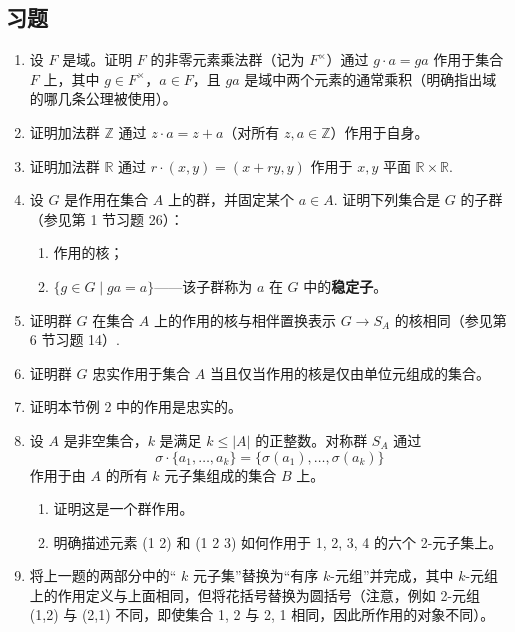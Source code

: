 \subsection*{习题}
\begin{enumerate}
\item 设 \( F \) 是域。证明 \( F \) 的非零元素乘法群（记为 \( F^\times \)）通过 \( g \cdot a = ga \) 作用于集合 \( F \) 上，其中 \( g \in F^\times \)，\( a \in F \)，且 \( ga \) 是域中两个元素的通常乘积（明确指出域的哪几条公理被使用）。

\item 证明加法群 \( \mathbb{Z} \) 通过 \( z \cdot a = z + a \)（对所有 \( z, a \in \mathbb{Z} \)）作用于自身。

\item 证明加法群 \( \mathbb{R} \) 通过 \( r \cdot (x, y) = (x + ry, y) \) 作用于 \( x, y \) 平面 \( \mathbb{R} \times \mathbb{R} \).

\item 设 \( G \) 是作用在集合 \( A \) 上的群，并固定某个 \( a \in A \). 证明下列集合是 \( G \) 的子群（参见第 1 节习题 26）：
\begin{enumerate}[label=(\alph*)]
\item 作用的核；
\item \( \{ g \in G \mid ga = a \} \)——该子群称为 \( a \) 在 \( G \) 中的\textbf{稳定子}。
\end{enumerate}

\item 证明群 \( G \) 在集合 \( A \) 上的作用的核与相伴置换表示 \( G \to S_A \) 的核相同（参见第 6 节习题 14）.

\item 证明群 \( G \) 忠实作用于集合 \( A \) 当且仅当作用的核是仅由单位元组成的集合。

\item 证明本节例 2 中的作用是忠实的。

\item 设 \( A \) 是非空集合，\( k \) 是满足 \( k \leq |A| \) 的正整数。对称群 \( S_A \) 通过
\[
\sigma \cdot \{a_1, \ldots, a_k\} = \{\sigma(a_1), \ldots, \sigma(a_k)\}
\]
作用于由 \( A \) 的所有 \( k \) 元子集组成的集合 \( B \) 上。
\begin{enumerate}[label=(\alph*)]
\item 证明这是一个群作用。
\item 明确描述元素 (1 2) 和 (1 2 3) 如何作用于 {1, 2, 3, 4} 的六个 2-元子集上。
\end{enumerate}

\item 将上一题的两部分中的“ \( k \) 元子集”替换为“有序 \( k \)-元组”并完成，其中 \( k \)-元组上的作用定义与上面相同，但将花括号替换为圆括号（注意，例如 2-元组 (1,2) 与 (2,1) 不同，即使集合 {1, 2} 与 {2, 1} 相同，因此所作用的对象不同）。


\end{enumerate}
